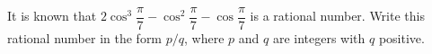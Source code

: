 It is known that $2 \cos^3 \dfrac{\pi}{7} - \cos^2 \dfrac{\pi}{7} - \cos
\dfrac{\pi}{7}$ is a rational number. Write this rational number in the form
$p/q$, where $p$ and $q$ are integers with $q$ positive.

